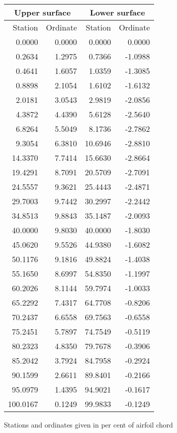 \documentclass[11pt]{book}
\begin{document}
 \hspace{4mm}
 \begin{tabular}{|r|r|r|r|} \hline 
 \multicolumn{2}{|c|}{Upper surface} & \multicolumn{2}{|c|}{Lower surface} \\
 \hline
 Station & Ordinate & Station & Ordinate \\
 \hline
0.0000 & 0.0000 & 0.0000 & 0.0000 \\
0.2634 & 1.2975 & 0.7366 & -1.0988 \\
0.4641 & 1.6057 & 1.0359 & -1.3085 \\
0.8898 & 2.1054 & 1.6102 & -1.6132 \\
2.0181 & 3.0543 & 2.9819 & -2.0856 \\
4.3872 & 4.4390 & 5.6128 & -2.5640 \\
6.8264 & 5.5049 & 8.1736 & -2.7862 \\
9.3054 & 6.3810 & 10.6946 & -2.8810 \\
14.3370 & 7.7414 & 15.6630 & -2.8664 \\
19.4291 & 8.7091 & 20.5709 & -2.7091 \\
24.5557 & 9.3621 & 25.4443 & -2.4871 \\
29.7003 & 9.7442 & 30.2997 & -2.2442 \\
34.8513 & 9.8843 & 35.1487 & -2.0093 \\
40.0000 & 9.8030 & 40.0000 & -1.8030 \\
45.0620 & 9.5526 & 44.9380 & -1.6082 \\
50.1176 & 9.1816 & 49.8824 & -1.4038 \\
55.1650 & 8.6997 & 54.8350 & -1.1997 \\
60.2026 & 8.1144 & 59.7974 & -1.0033 \\
65.2292 & 7.4317 & 64.7708 & -0.8206 \\
70.2437 & 6.6558 & 69.7563 & -0.6558 \\
75.2451 & 5.7897 & 74.7549 & -0.5119 \\
80.2323 & 4.8350 & 79.7678 & -0.3906 \\
85.2042 & 3.7924 & 84.7958 & -0.2924 \\
90.1599 & 2.6611 & 89.8401 & -0.2166 \\
95.0979 & 1.4395 & 94.9021 & -0.1617 \\
100.0167 & 0.1249 & 99.9833 & -0.1249 \\
 \hline 
 \end{tabular}
 \vspace{8mm}

Stations and ordinates given in per cent of airfoil chord
\end{document}
